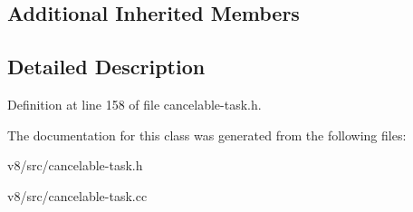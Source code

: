 \subsection*{Additional Inherited Members}


\subsection{Detailed Description}


Definition at line 158 of file cancelable-\/task.\+h.



The documentation for this class was generated from the following files\+:\begin{DoxyCompactItemize}
\item 
v8/src/cancelable-\/task.\+h\item 
v8/src/cancelable-\/task.\+cc\end{DoxyCompactItemize}
